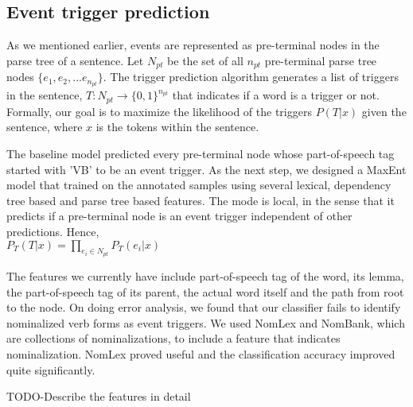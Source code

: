 \subsection{Event trigger prediction}
As we mentioned earlier, events are represented as pre-terminal nodes in the parse tree of a sentence. Let $N_{pt}$ be the set of all $n_{pt}$ pre-terminal parse tree nodes $\{e_1, e_2, ... e_{n_{pt}}\}$. The trigger prediction algorithm generates a list of triggers in the sentence, $T : N_{pt} \rightarrow \{0,1\}^{n_{pt}}$ that indicates if a word is a trigger or not. Formally, our goal is to maximize the likelihood of the triggers $P(T | x)$ given the sentence, where $x$ is the tokens within the sentence.

The baseline model predicted every pre-terminal node whose part-of-speech tag started with 'VB' to be an event trigger. As the next step, we designed a MaxEnt model that trained on the annotated samples using several lexical, dependency tree based and parse tree based features. The mode is local, in the sense that it predicts if a pre-terminal node is an event trigger independent of other predictions. Hence, \\

$P_{T}(T | x) = \prod_{e_{i}\in N_{pt}} P_{T}(e_{i} | x) $

The features we currently have include part-of-speech tag of the word, its lemma, the part-of-speech tag of its parent, the actual word itself and the path from root to the node. On doing error analysis, we found that our classifier fails to identify nominalized verb forms as event triggers. We used NomLex and NomBank, which are collections of nominalizations, to include a feature that indicates nominalization. NomLex proved useful and the classification accuracy improved quite significantly.

TODO-Describe the features in detail
